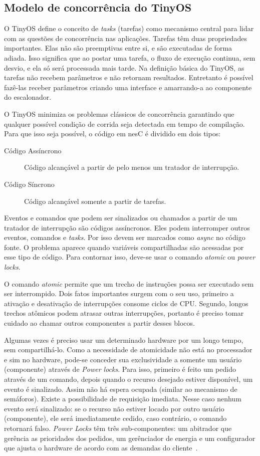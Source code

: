 \documentclass[a4paper, 10pt]{article}
\begin{document}
\subsection{Modelo de concorrência do TinyOS}
O TinyOS define o conceito de {\em tasks} (tarefas) como mecanismo central para
lidar com as questões de concorrência nas aplicações. 
Tarefas têm duas propriedades importantes. Elas não são preemptivas entre si, e são
executadas de forma adiada. Isso significa que ao postar uma tarefa, o fluxo de execução continua,
sem desvio, e ela só será processada mais tarde. 
Na definição básica do TinyOS, as tarefas não recebem parâmetros e não retornam resultados. 
Entretanto é possível fazê-las receber parâmetros criando uma interface e amarrando-a ao componente do escalonador.

O TinyOS minimiza os problemas clássicos de concorrência garantindo que qualquer possível condição de
corrida seja detectada em tempo de compilação. Para que isso seja possível, o código em nesC é dividido em dois tipos:
\begin{description}
    \item[Código Assíncrono] Código alcançável a partir de pelo menos um tratador de interrupção.
    \item[Código Síncrono] Código alcançável somente a partir de tarefas.
\end{description}

Eventos e comandos que podem ser sinalizados ou chamados a partir de um tratador de interrupção são códigos assíncronos.
Eles podem interromper outros eventos, comandos e \textit{tasks}. Por isso devem ser marcados como \textit{async} no
código fonte. O problema aparece quando variáveis compartilhadas são acessadas por esse tipo de código. Para contornar
isso, deve-se usar o comando \textit{atomic} ou \textit{power locks}.

O comando \textit{atomic} permite que um trecho de instruções possa ser executado sem ser interrompido. Dois fatos
importantes surgem com o seu uso, primeiro a ativação e desativação de interrupções consome ciclos de CPU. Segundo,
longos trechos atômicos podem atrasar outras interrupções, portanto é preciso tomar cuidado ao chamar outros componentes
a partir desses blocos.

Algumas vezes é preciso usar um determinado hardware por um longo tempo, sem compartilhá-lo. 
Como a necessidade de atomicidade não está no processador e sim no hardware, 
pode-se conceder sua exclusividade a somente um usuário (componente) através de
\textit{Power locks}. Para isso, primeiro é feito um pedido através de um comando, depois quando o recurso desejado
estiver disponível, um evento é sinalizado. Assim não há espera ocupada (similar ao mecanismo de semáforos). 
Existe a possibilidade de requisição imediata. 
Nesse caso nenhum evento será sinalizado: se o recurso não estiver locado por outro usuário (componente), ele será
imediatamente cedido, caso contrário, o comando retornará falso. \textit{Power Locks} têm três sub-componentes: um
abitrador que gerência as prioridades dos pedidos, um gerênciador de energia e um configurador que ajusta o hardware de
acordo com as demandas do cliente~\cite[Cap.11]{LevisGay/09}.
\end{document}
